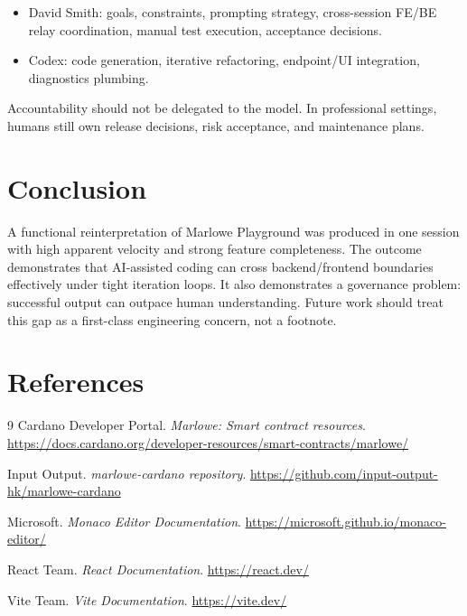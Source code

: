 \documentclass[11pt]{article}
\begin{document}
\begin{itemize}
  \item David Smith: goals, constraints, prompting strategy, cross-session FE/BE relay coordination, manual test execution, acceptance decisions.
  \item Codex: code generation, iterative refactoring, endpoint/UI integration, diagnostics plumbing.
\end{itemize}

Accountability should not be delegated to the model. In professional settings, humans still own release decisions, risk acceptance, and maintenance plans.

\section{Conclusion}
A functional reinterpretation of Marlowe Playground was produced in one session with high apparent velocity and strong feature completeness. The outcome demonstrates that AI-assisted coding can cross backend/frontend boundaries effectively under tight iteration loops. It also demonstrates a governance problem: successful output can outpace human understanding. Future work should treat this gap as a first-class engineering concern, not a footnote.

\section*{References}
\begin{thebibliography}{9}
Cardano Developer Portal. \emph{Marlowe: Smart contract resources}.\newline
\url{https://docs.cardano.org/developer-resources/smart-contracts/marlowe/}

Input Output. \emph{marlowe-cardano repository}.\newline
\url{https://github.com/input-output-hk/marlowe-cardano}

Microsoft. \emph{Monaco Editor Documentation}.\newline
\url{https://microsoft.github.io/monaco-editor/}

React Team. \emph{React Documentation}.\newline
\url{https://react.dev/}

Vite Team. \emph{Vite Documentation}.\newline
\url{https://vite.dev/}
\end{thebibliography}
\end{document}
